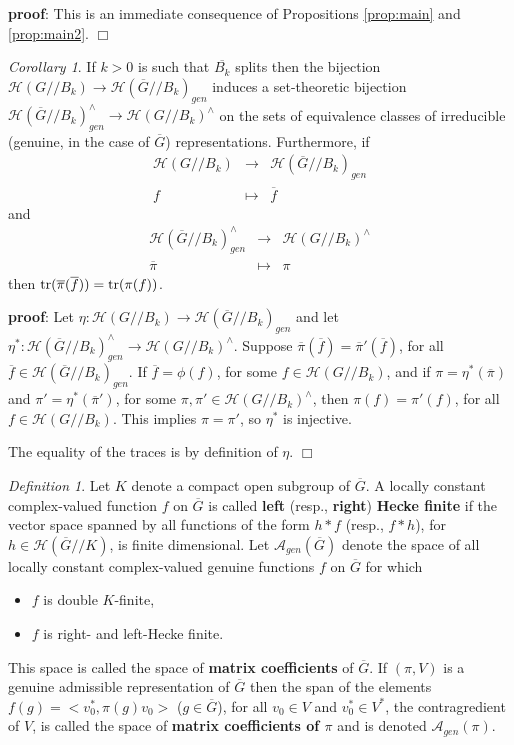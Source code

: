 \documentclass[12pt,letterpaper]{amsart}
\theoremstyle{definition}
\theoremstyle{remark}
\newtheorem{corollary}[theorem]{Corollary}
\newtheorem{definition}[theorem]{Definition}
\begin{document}
{\bf proof}: This is an immediate consequence of
Propositions \ref{prop:main} and \ref{prop:main2}. $\Box$

\begin{corollary}
\label{corollary:main}
If $k>0$ is such that $\overline{B_k}$ splits then the bijection
$\mathcal{H}(G//B_k)\rightarrow \mathcal{H}(\overline{G}//B_k)_{gen}$
induces a set-theoretic 
bijection $\mathcal{H}(\overline{G}//B_k)_{gen}^\wedge
\rightarrow \mathcal{H}(G//B_k)^\wedge$ on the sets of equivalence
classes of irreducible (genuine, in the case of $\overline{G}$)
representations. Furthermore, if
\[
\begin{array}{ccc}
\mathcal{H}(G//B_k)&\rightarrow &\mathcal{H}(\overline{G}//B_k)_{gen}\\
f & \longmapsto &\overline{f}
\end{array}
\]
and 
\[
\begin{array}{ccc}
\mathcal{H}(\overline{G}//B_k)_{gen}^\wedge 
  &\rightarrow &\mathcal{H}(G//B_k)^\wedge\\
\overline{\pi}&\longmapsto &\pi
\end{array}
\]
then ${\rm tr}(\overline{\pi}(\overline{f}))={\rm tr}(\pi(f))$.
\end{corollary}

{\bf proof}: Let
$\eta:\mathcal{H}(G//B_k)\rightarrow \mathcal{H}(\overline{G}//B_k)_{gen}$
and let $\eta^*:\mathcal{H}(\overline{G}//B_k)_{gen}^\wedge
\rightarrow \mathcal{H}(G//B_k)^\wedge$. Suppose
$\overline{\pi}(\overline{f})=\overline{\pi}'(\overline{f})$,
for all $\overline{f}\in \mathcal{H}(\overline{G}//B_k)_{gen}$. If 
$\overline{f}=\phi(f)$, for some $f\in \mathcal{H}(G//B_k)$,
and if $\pi=\eta^*(\overline{\pi})$ and $\pi'=\eta^*(\overline{\pi}')$, 
for some $\pi,\pi'\in \mathcal{H}(G//B_k)^\wedge$, then 
$\pi(f)=\pi'(f)$, for all $f\in \mathcal{H}(G//B_k)$.
This implies $\pi=\pi'$, so $\eta^*$ is injective.

The equality of the traces is by definition of $\eta$. $\Box$ 

\begin{definition} 
Let $K$ denote a compact open subgroup of $\overline{G}$.
A locally constant
complex-valued function $f$ on $\overline{G}$
is called {\bf left} (resp., {\bf right}) {\bf Hecke finite}
if the vector space spanned by all functions of the form
$h*f$ (resp., $f*h$), for $h\in \mathcal{H}(\overline{G}//K)$,
is finite dimensional. Let $\mathcal{A}_{gen}(\overline{G})$
denote the space of all locally constant
complex-valued genuine functions
$f$ on $\overline{G}$ for which
\begin{itemize}
\item
$f$ is double $K$-finite,
\item
$f$ is right- and left-Hecke finite. 
\end{itemize}
This space is called the space of {\bf matrix
coefficients} of $\overline{G}$.
If $(\pi,V)$ is a genuine admissible representation
of $\overline{G}$ then the span of the
elements $f(g)=<v_0^*,\pi(g)v_0>$ ($g\in \overline{G}$),
for all $v_0\in V$ and $v_0^*\in V^*$,
the contragredient of $V$, is called the space 
of {\bf matrix coefficients of $\pi$} and is
denoted $\mathcal{A}_{gen}(\pi)$.
\end{definition}
\end{document}
